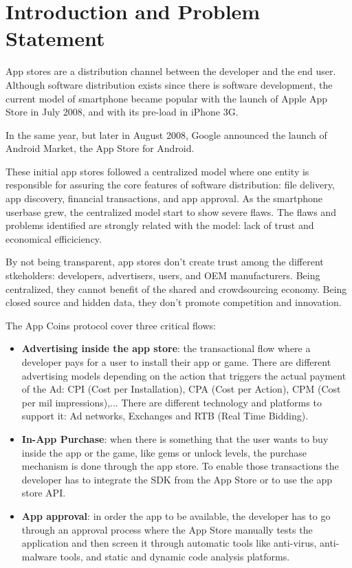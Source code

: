 
\section{Introduction and Problem Statement}



App stores are a distribution channel between the developer and the end user. Although software distribution exists since there is software development, the current model of smartphone became popular with the launch of Apple App Store in July 2008, and with its pre-load in iPhone 3G.

In the same year, but later in August 2008, Google announced the launch of Android Market\cite{wiki:market}, the App Store for Android.

These initial app stores followed a centralized model where one entity is responsible for assuring the core features of software distribution: file delivery, app discovery, financial transactions, and app approval. As the smartphone userbase grew, the centralized model start to show severe flaws. The flaws and problems identified are strongly related with the model: lack of trust and economical efficiciency. 

By not being transparent, app stores don't create trust among the different stkeholders: developers, advertisers, users, and OEM manufacturers. Being centralized, they cannot benefit of the shared and crowdsourcing economy. Being closed source and hidden data, they don't promote competition and innovation.

The App Coins protocol cover three critical flows:

\begin{itemize}
\item {\bf Advertising inside the app store}: the transactional flow where a developer pays for a user to install their app or game. There are different advertising models depending on the action that triggers the actual payment of the Ad: CPI (Cost per Installation), CPA (Cost per Action), CPM (Cost per mil impressions),... There are different technology and platforms to support it: Ad networks, Exchanges and RTB (Real Time Bidding).
\item {\bf In-App Purchase}: when there is something that the user wants to buy inside the app or the game, like gems or unlock levels, the purchase mechanism is done through the app store. To enable those transactions the developer has to integrate the SDK from the App Store or to use the app store API.
\item {\bf App approval}: in order the app to be available, the developer has to go through an approval process where the App Store manually tests the application and then screen it through automatic tools like anti-virus, anti-malware tools, and static and dynamic code analysis platforms.
\end{itemize}

